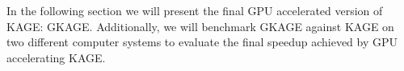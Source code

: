 In the following section we will present the final GPU accelerated version of KAGE: GKAGE. 
Additionally, we will benchmark GKAGE against KAGE on two different computer systems to evaluate the final speedup achieved by GPU accelerating KAGE.


